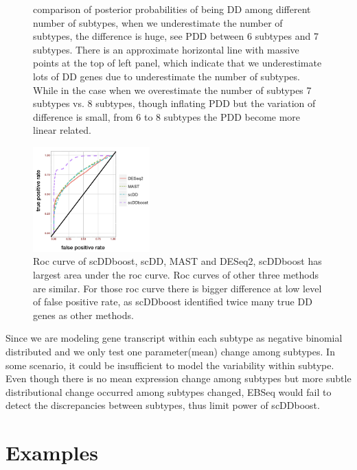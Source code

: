 \documentclass[11pt]{amsart}
\begin{document}
\begin{figure}[h]
  \endminipage
\caption{comparison of posterior probabilities of being DD among different number of subtypes, when we underestimate the number of subtypes, the difference is huge, see PDD between 6 subtypes and 7 subtypes. There is an approximate horizontal line with massive points at the top of left panel, which indicate that we underestimate lots of DD genes due to underestimate the number of subtypes. While in the case when we overestimate the number of subtypes 7 subtypes vs. 8 subtypes, though inflating PDD but the variation of difference is small, from 6 to 8 subtypes the PDD become more linear related.}
\end{figure}
\begin{figure}[H]
  \includegraphics[width = 0.4\textwidth]{roc.png}
  \caption{Roc curve of scDDboost, scDD, MAST and DESeq2, scDDboost has largest area under the roc curve. Roc curves of other three methods are similar. For those roc curve there is bigger difference at low level of false positive rate, as scDDboost identified twice many true DD genes as other methods.}
  \label{fig:5}
\end{figure}

Since we are modeling gene transcript within each subtype as negative binomial distributed and we only test one parameter(mean) change among subtypes. In some scenario, it could be insufficient to model the variability within subtype. Even though there is no mean expression change among subtypes but more subtle distributional change occurred among subtypes changed, EBSeq would fail to detect the discrepancies between subtypes, thus limit power of scDDboost.\\
\newpage
\section{Examples}
\end{document}
